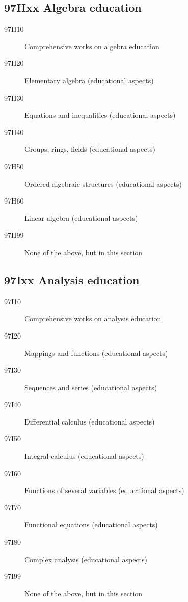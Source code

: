 \documentclass[letterpaper]{article}
\begin{document}
\subsection*{97Hxx  Algebra education }\label{97Hxx}
\begin{description}  
\item [97H10]\label{97H10} Comprehensive works on algebra education
\item [97H20]\label{97H20} Elementary algebra (educational aspects)
\item [97H30]\label{97H30} Equations and inequalities (educational aspects)
\item [97H40]\label{97H40} Groups, rings, fields (educational aspects)
\item [97H50]\label{97H50} Ordered algebraic structures (educational aspects)
\item [97H60]\label{97H60} Linear algebra (educational aspects)
\item [97H99]\label{97H99} None of the above, but in this section
\end{description}
\subsection*{97Ixx  Analysis education }\label{97Ixx}
\begin{description}  
\item [97I10]\label{97I10} Comprehensive works on analysis education
\item [97I20]\label{97I20} Mappings and functions (educational aspects)
\item [97I30]\label{97I30} Sequences and series (educational aspects)
\item [97I40]\label{97I40} Differential calculus (educational aspects)
\item [97I50]\label{97I50} Integral calculus (educational aspects)
\item [97I60]\label{97I60} Functions of several variables (educational aspects)
\item [97I70]\label{97I70} Functional equations (educational aspects)
\item [97I80]\label{97I80} Complex analysis (educational aspects)
\item [97I99]\label{97I99} None of the above, but in this section
\end{description}
\end{document}
